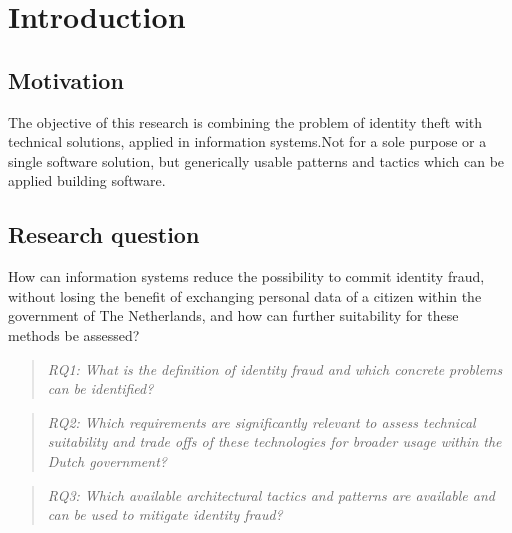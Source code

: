 \chapter{Introduction}\label{s:intro}


\section{Motivation}
The objective of this research is combining the problem of identity theft with technical solutions, applied in information systems.Not for a sole purpose or a single software solution, but generically usable patterns and tactics which can be applied building software.

\section{Research question}
How can information systems reduce the possibility to commit identity fraud, without losing the benefit of exchanging personal data of a citizen within the government of The Netherlands, and how can further suitability for these methods be assessed?

\begin{quote}\emph{RQ1: What is the definition of identity fraud and which concrete problems can be identified?}\end{quote}
\begin{quote}\emph{RQ2: Which requirements are significantly relevant to assess technical suitability and trade offs of these technologies for broader usage within the Dutch government?}\end{quote}
\begin{quote}\emph{RQ3: Which available architectural tactics and patterns are available and can be used to mitigate identity fraud?}\end{quote}

\break

